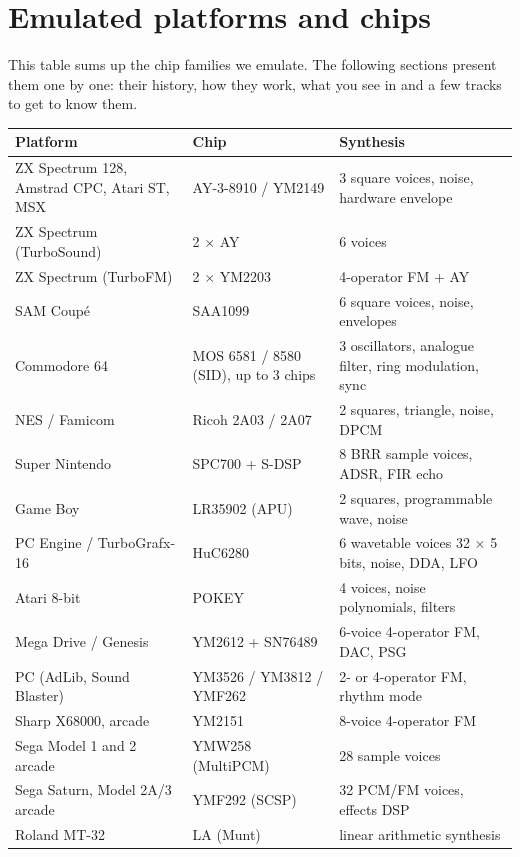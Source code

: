 \chapter{Emulated platforms and chips}
This table sums up the chip families we emulate. The following sections present them one by one: their history,
how they work, what you see in \soft and a few tracks to get to know them.

\begin{longtable}{@{}p{} p{} p{}@{}}
\toprule \textbf{Platform} & \textbf{Chip} & \textbf{Synthesis} \\ \midrule \endhead
ZX Spectrum 128, Amstrad CPC, Atari ST, MSX & AY-3-8910 / YM2149 & 3 square voices, noise, hardware envelope \\
ZX Spectrum (TurboSound) & 2 $\times$ AY & 6 voices \\
ZX Spectrum (TurboFM) & 2 $\times$ YM2203 & 4-operator FM + AY \\
SAM Coupé & SAA1099 & 6 square voices, noise, envelopes \\
Commodore 64 & MOS 6581 / 8580 (SID), up to 3 chips & 3 oscillators, analogue filter, ring modulation, sync \\
NES / Famicom & Ricoh 2A03 / 2A07 & 2 squares, triangle, noise, DPCM \\
Super Nintendo & SPC700 + S-DSP & 8 BRR sample voices, ADSR, FIR echo \\
Game Boy & LR35902 (APU) & 2 squares, programmable wave, noise \\
PC Engine / TurboGrafx-16 & HuC6280 & 6 wavetable voices 32 $\times$ 5 bits, noise, DDA, LFO \\
Atari 8-bit & POKEY & 4 voices, noise polynomials, filters \\
Mega Drive / Genesis & YM2612 + SN76489 & 6-voice 4-operator FM, DAC, PSG \\
PC (AdLib, Sound Blaster) & YM3526 / YM3812 / YMF262 & 2- or 4-operator FM, rhythm mode \\
Sharp X68000, arcade & YM2151 & 8-voice 4-operator FM \\
Sega Model 1 and 2 arcade & YMW258 (MultiPCM) & 28 sample voices \\
Sega Saturn, Model 2A/3 arcade & YMF292 (SCSP) & 32 PCM/FM voices, effects DSP \\
Roland MT-32 & LA (Munt) & linear arithmetic synthesis \\
\bottomrule
\end{longtable}

